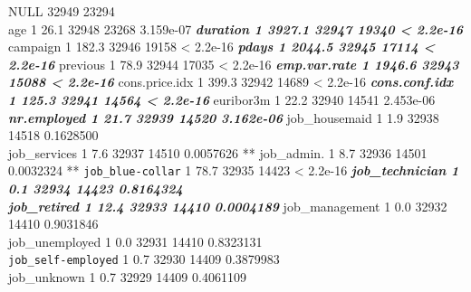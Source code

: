 \documentclass[english,man]{apa6}
\begin{document}
NULL 32949 23294\\
age 1 26.1 32948 23268 3.159e-07 \textbf{\emph{ duration 1 3927.1 32947
19340 \textless{} 2.2e-16 }} campaign 1 182.3 32946 19158 \textless{}
2.2e-16 \textbf{\emph{ pdays 1 2044.5 32945 17114 \textless{} 2.2e-16 }}
previous 1 78.9 32944 17035 \textless{} 2.2e-16 \textbf{\emph{
emp.var.rate 1 1946.6 32943 15088 \textless{} 2.2e-16 }} cons.price.idx
1 399.3 32942 14689 \textless{} 2.2e-16 \textbf{\emph{ cons.conf.idx 1
125.3 32941 14564 \textless{} 2.2e-16 }} euribor3m 1 22.2 32940 14541
2.453e-06 \textbf{\emph{ nr.employed 1 21.7 32939 14520 3.162e-06 }}
job\_housemaid 1 1.9 32938 14518 0.1628500\\
job\_services 1 7.6 32937 14510 0.0057626 ** job\_admin. 1 8.7 32936
14501 0.0032324 ** \texttt{job\_blue-collar} 1 78.7 32935 14423
\textless{} 2.2e-16 \textbf{\emph{ job\_technician 1 0.1 32934 14423
0.8164324\\
job\_retired 1 12.4 32933 14410 0.0004189 }} job\_management 1 0.0 32932
14410 0.9031846\\
job\_unemployed 1 0.0 32931 14410 0.8323131\\
\texttt{job\_self-employed} 1 0.7 32930 14409 0.3879983\\
job\_unknown 1 0.7 32929 14409 0.4061109\\
\end{document}
